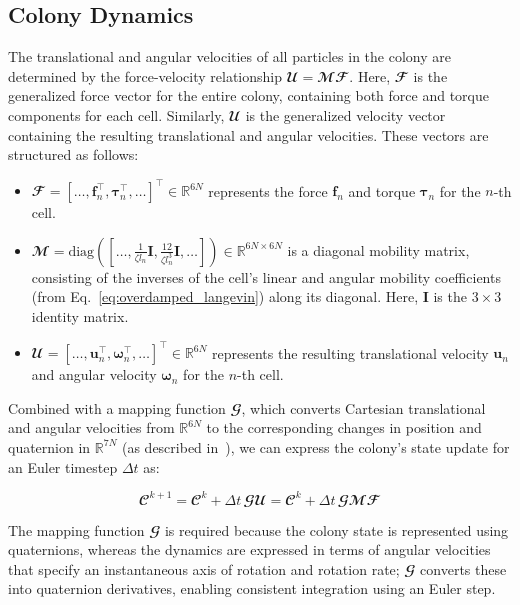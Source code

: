 \documentclass[conference]{IEEEtran}
\begin{document}
\subsection{Colony Dynamics}

The translational and angular velocities of all particles in the colony are determined by the force-velocity relationship $\mathbfcal{U} = \mathbfcal{M} \mathbfcal{F}$. Here, $\mathbfcal{F}$ is the generalized force vector for the entire colony, containing both force and torque components for each cell. Similarly, $\mathbfcal{U}$ is the generalized velocity vector containing the resulting translational and angular velocities. These vectors are structured as follows:

\begin{itemize}
    \item
          $\mathbfcal{F} = [\dots, \mathbf{f}_n^\top, \boldsymbol{\tau}_n^\top, \dots]^\top \in \mathbb{R}^{6N}$ represents the force $\mathbf{f}_n$ and torque $\boldsymbol{\tau}_n$ for the $n$-th cell.
    \item
          $\mathbfcal{M} = \text{diag}([\dots, \frac{1}{\zeta l_n}\mathbf{I}, \frac{12}{\zeta l_n^3}\mathbf{I}, \dots]) \in \mathbb{R}^{6N \times 6N}$ is a diagonal mobility matrix, consisting of the inverses of the cell's linear and angular mobility coefficients (from Eq.~\ref{eq:overdamped_langevin}) along its diagonal. Here, $\mathbf{I}$ is the $3 \times 3$ identity matrix.
    \item
          $\mathbfcal{U} = [\dots, \mathbf{u}_n^\top, \boldsymbol{\omega}_n^\top, \dots]^\top \in \mathbb{R}^{6N}$ represents the resulting translational velocity $\mathbf{u}_n$ and angular velocity $\boldsymbol{\omega}_n$ for the $n$-th cell.
\end{itemize}


Combined with a mapping function $\mathbfcal{G}$, which converts Cartesian translational and angular velocities from $\mathbb{R}^{6N}$ to the corresponding changes in position and quaternion in $\mathbb{R}^{7N}$ (as described in~\cite{Weady2024, Tasora2008}), we can express the colony's state update for an Euler timestep $\Delta t$ as:

\begin{equation} \label{eq:colony_update}
    \mathbfcal{C}^{k+1} = \mathbfcal{C}^k + \Delta t \, \mathbfcal{G} \mathbfcal{U} = \mathbfcal{C}^k + \Delta t \, \mathbfcal{G} \mathbfcal{M} \mathbfcal{F}
\end{equation}

The mapping function $\mathbfcal{G}$ is required because the colony state is represented using quaternions, whereas the dynamics are expressed in terms of angular velocities that specify an instantaneous axis of rotation and rotation rate; $\mathbfcal{G}$ converts these into quaternion derivatives, enabling consistent integration using an Euler step\cite{Weady2024, Tasora2008}.
\end{document}
